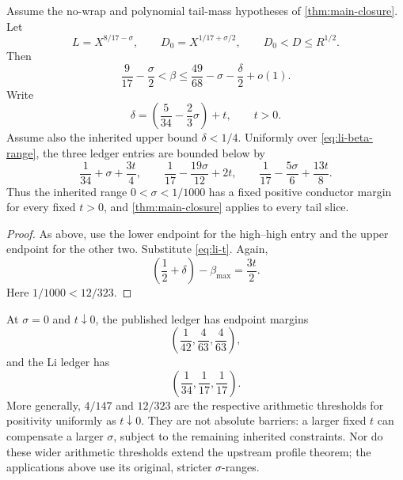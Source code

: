 \begin{corollary}
\label{cor:li-profile}
Assume the no-wrap and polynomial tail-mass hypotheses of
\cref{thm:main-closure}.  Let
\begin{equation}
 L=X^{8/17-\sigma},\qquad
 D_0=X^{1/17+\sigma/2},\qquad D_0<D\le R^{1/2}.
 \label{eq:li-data}
\end{equation}
Then
\begin{equation}
 \frac9{17}-\frac\sigma2<\beta
 \le\frac{49}{68}-\sigma-\frac\delta2+o(1).
 \label{eq:li-beta-range}
\end{equation}
Write
\begin{equation}
 \delta=\left(\frac5{34}-\frac23\sigma\right)+t,
 \qquad t>0.
 \label{eq:li-t}
\end{equation}
Assume also the inherited upper bound \(\delta<1/4\).
Uniformly over \eqref{eq:li-beta-range}, the three ledger entries are
bounded below by
\begin{equation}
 \frac1{34}+\sigma+\frac{3t}{4},\qquad
 \frac1{17}-\frac{19\sigma}{12}+2t,\qquad
 \frac1{17}-\frac{5\sigma}{6}+\frac{13t}{8}.
 \label{eq:li-gains}
\end{equation}
Thus the inherited range \(0<\sigma<1/1000\) has a fixed positive
conductor margin for every fixed \(t>0\), and
\cref{thm:main-closure} applies to every tail slice.
\end{corollary}

\begin{proof}
As above, use the lower endpoint for the high--high entry and the upper
endpoint for the other two.  Substitute \eqref{eq:li-t}.  Again,
\[
 \left(\frac12+\delta\right)-\beta_{\max}=\frac{3t}{2}.
\]
Here
\(1/1000<12/323\).
\end{proof}

At \(\sigma=0\) and \(t\downarrow0\), the published ledger has endpoint
margins
\begin{equation}
 \left(\frac1{42},\frac4{63},\frac4{63}\right),
 \label{eq:published-zero-margins}
\end{equation}
and the Li ledger has
\begin{equation}
 \left(\frac1{34},\frac1{17},\frac1{17}\right).
 \label{eq:li-zero-margins}
\end{equation}
More generally, \(4/147\) and \(12/323\) are the respective arithmetic
thresholds for positivity uniformly as \(t\downarrow0\).  They are not
absolute barriers: a larger fixed \(t\) can compensate a larger
\(\sigma\), subject to the remaining inherited constraints.  Nor do
these wider arithmetic thresholds extend the upstream profile theorem;
the applications above use its original, stricter \(\sigma\)-ranges.
